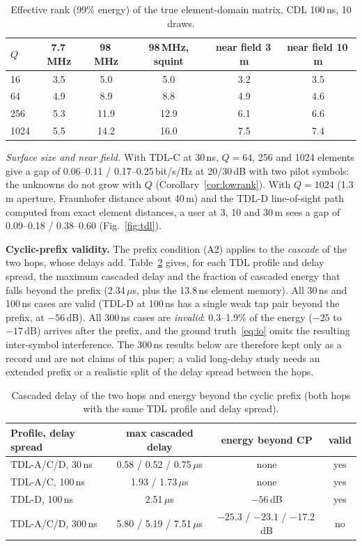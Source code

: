 \begin{table}[!htbp]\centering
\caption{Effective rank (99\% energy) of the true element-domain matrix, CDL 100\,ns, 10 draws.}\label{tab:rank}
\begin{tabular}{lccccc}\toprule
$Q$ & 7.7\,MHz & 98\,MHz & 98\,MHz, squint & near field 3\,m & near field 10\,m \\\midrule
16 & 3.5 & 5.0 & 5.0 & 3.2 & 3.5 \\
64 & 4.9 & 8.9 & 8.8 & 4.9 & 4.6 \\
256 & 5.3 & 11.9 & 12.9 & 6.1 & 6.6 \\
1024 & 5.5 & 14.2 & 16.0 & 7.5 & 7.4 \\\bottomrule
\end{tabular}
\end{table}

\emph{Surface size and near field.} With TDL-C at 30\,ns, $Q=64$, 256 and 1024 elements give a gap
of 0.06--0.11 / 0.17--0.25\,bit/s/Hz at 20/30\,dB with two pilot symbols: the unknowns do not grow
with $Q$ (Corollary~\ref{cor:lowrank}). With $Q=1024$ (1.3\,m aperture, Fraunhofer distance about 40\,m)
and the TDL-D line-of-sight path computed from exact element distances, a user at 3, 10 and 30\,m
sees a gap of 0.09--0.18 / 0.38--0.60 (Fig.~\ref{fig:tdl}).

\textbf{Cyclic-prefix validity.} The prefix condition (A2) applies to the \emph{cascade} of the two hops, whose
delays add. Table~\ref{tab:cp} gives, for each TDL profile and delay spread, the maximum cascaded delay and the
fraction of cascaded energy that falls beyond the prefix (2.34\,$\mu$s, plus the 13.8\,ns element memory). All 30\,ns
and 100\,ns cases are valid (TDL-D at 100\,ns has a single weak tap pair beyond the prefix, at $-56$\,dB). All 300\,ns
cases are \emph{invalid}: 0.3--1.9\% of the energy ($-25$ to $-17$\,dB) arrives after the prefix, and the ground
truth~\eqref{eq:io} omits the resulting inter-symbol interference. The 300\,ns results below are therefore kept only as
a record and are not claims of this paper; a valid long-delay study needs an extended prefix or a realistic split
of the delay spread between the hops.

\begin{table}[!htbp]\centering
\caption{Cascaded delay of the two hops and energy beyond the cyclic prefix (both hops with the same TDL profile and delay spread).}\label{tab:cp}
\begin{tabular}{lccc}\toprule
Profile, delay spread & max cascaded delay & energy beyond CP & valid \\\midrule
TDL-A/C/D, 30\,ns & 0.58 / 0.52 / 0.75\,$\mu$s & none & yes \\
TDL-A/C, 100\,ns & 1.93 / 1.73\,$\mu$s & none & yes \\
TDL-D, 100\,ns & 2.51\,$\mu$s & $-56$\,dB & yes \\
TDL-A/C/D, 300\,ns & 5.80 / 5.19 / 7.51\,$\mu$s & $-25.3$ / $-23.1$ / $-17.2$\,dB & no \\\bottomrule
\end{tabular}
\end{table}

